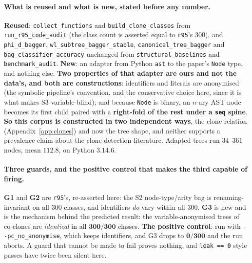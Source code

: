 \paragraph{What is reused and what is new, stated before any number.} \textbf{Reused}: \texttt{collect\_functions} and \texttt{build\_clone\_classes} from \texttt{run\_r95\_code\_audit} (the class count is asserted equal to \texttt{r95}'s $300$), and \texttt{phi\_d\_bagger}, \texttt{wl\_subtree\_bagger\_stable}, \texttt{canonical\_tree\_bagger} and \texttt{bag\_classifier\_accuracy} unchanged from \texttt{structural\_baselines} and \texttt{benchmark\_audit}. \textbf{New}: an adapter from Python \texttt{ast} to the paper's \texttt{Node} type, and nothing else. \textbf{Two properties of that adapter are ours and not the data's, and both are constructions}: identifiers and literals are anonymised (the symbolic pipeline's convention, and the conservative choice here, since it is what makes S3 variable-blind); and because \texttt{Node} is binary, an $n$-ary AST node becomes its first child paired with a \textbf{right-fold of the rest under a \texttt{seq} spine}. \textbf{So this corpus is constructed in two independent ways}, the clone relation (Appendix~\ref{app:clones}) and now the tree shape, and neither supports a prevalence claim about the clone-detection literature. Adapted trees run $34$--$361$ nodes, mean $112.8$, on Python $3.14.6$.

\paragraph{Three guards, and the positive control that makes the third capable of firing.} \textbf{G1} and \textbf{G2} are \texttt{r95}'s, re-asserted here: the S2 node-type/arity bag is renaming-invariant on all $300$ classes, and identifiers \emph{do} vary within all $300$. \textbf{G3} is new and is the mechanism behind the predicted result: the variable-anonymised trees of co-clones are \emph{identical} in all $\mathbf{300/300}$ classes. \textbf{The positive control}: run with \texttt{-{}-pc\_no\_anonymise}, which keeps identifiers, and G3 drops to $\mathbf{0/300}$ and the run aborts. A guard that cannot be made to fail proves nothing, and \texttt{leak == 0} style passes have twice been silent here.

